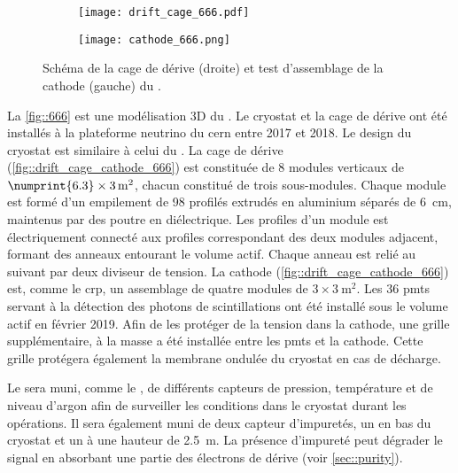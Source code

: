       \begin{figure}[!htb]
        \begin{subfigure}{0.48\textwidth}
          \centering
          \texttt{[image: drift\_cage\_666.pdf]}
        \end{subfigure}\hfill
        \begin{subfigure}{0.48\textwidth}
          \centering
          \texttt{[image: cathode\_666.png]}
        \end{subfigure}
        \caption[Cathode et cage de dérive du \SSS{}]{\label{fig::drift_cage_cathode_666}Schéma de la cage de dérive (droite) et test d'assemblage de la cathode (gauche) du \SSS{}.}
      \end{figure}

      La \autoref{fig::666} est une modélisation 3D du \SSS{}. Le cryostat et la cage de dérive ont été installés à la plateforme neutrino du \gls{cern} entre 2017 et 2018. Le design du cryostat est similaire à celui du \TOO{}. La cage de dérive (\autoref{fig::drift_cage_cathode_666}) est constituée de 8 modules verticaux de $\numprint{6.3}\times\SI{3}{\meter\squared}$, chacun constitué de trois sous-modules. Chaque module est formé d'un empilement de 98 profilés extrudés en aluminium séparés de \SI{6}{\centi\meter}, maintenus par des poutre en diélectrique. Les profiles d'un module est électriquement connecté aux profiles correspondant des deux modules adjacent, formant des anneaux entourant le volume actif. Chaque anneau est relié au suivant par deux diviseur de tension. La cathode (\autoref{fig::drift_cage_cathode_666}) est, comme le \gls{crp}, un assemblage de quatre modules de $3\times\SI{3}{\meter\squared}$. Les 36 \glspl{pmt} servant à la détection des photons de scintillations ont été installé sous le volume actif en février 2019. Afin de les protéger de la tension dans la cathode, une grille supplémentaire, à la masse a été installée entre les \glspl{pmt} et la cathode. Cette grille protégera également la membrane ondulée du cryostat en cas de décharge. 

      Le \SSS{} sera muni, comme le \TOO{}, de différents capteurs de pression, température et de niveau d'argon afin de surveiller les conditions dans le cryostat durant les opérations. Il sera également muni de deux capteur d'impuretés, un en bas du cryostat et un à une hauteur de \SI{2.5}{\meter}. La présence d'impureté peut dégrader le signal en absorbant une partie des électrons de dérive (voir \autoref{sec::purity}).

